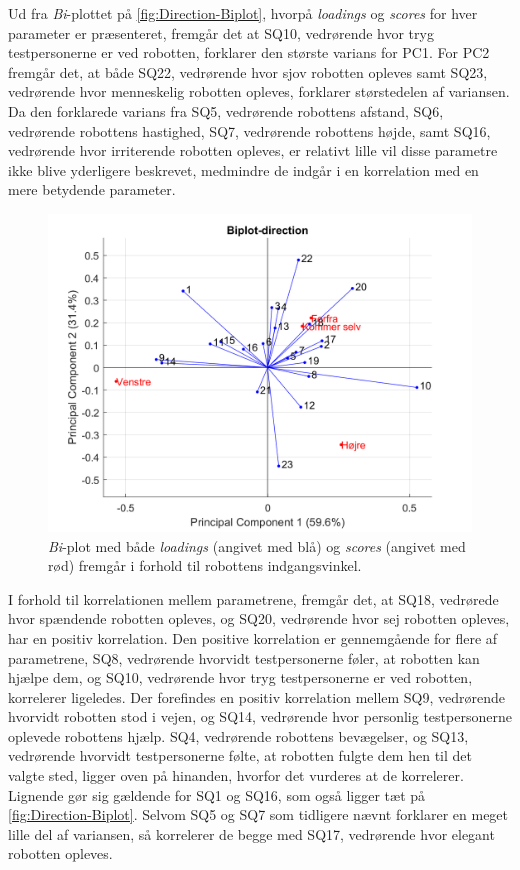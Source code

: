 \newpage
\noindent
%
Ud fra \textit{Bi}-plottet på \autoref{fig:Direction-Biplot}, hvorpå \textit{loadings} og \textit{scores} for hver parameter er præsenteret, fremgår det at SQ10, vedrørende hvor tryg testpersonerne er ved robotten, forklarer den største varians for PC1. For PC2 fremgår det, at både SQ22, vedrørende hvor sjov robotten opleves samt SQ23, vedrørende hvor menneskelig robotten opleves, forklarer størstedelen af variansen. Da den forklarede varians fra SQ5, vedrørende robottens afstand, SQ6, vedrørende robottens hastighed, SQ7, vedrørende robottens højde, samt SQ16, vedrørende hvor irriterende robotten opleves, er relativt lille vil disse parametre ikke blive yderligere beskrevet, medmindre de indgår i en korrelation med en mere betydende parameter.  
%
\begin{figure}[H]
\centering
\includegraphics[width=\textwidth]{Figure/DatabehandlingSkalaer/PCAfigures/Direction-Biplot.png}
\caption{\textit{Bi}-plot med både \textit{loadings} (angivet med blå) og \textit{scores} (angivet med rød) fremgår i forhold til robottens indgangsvinkel.}
\label{fig:Direction-Biplot}
\end{figure}
\noindent
%
I forhold til korrelationen mellem parametrene, fremgår det, at SQ18, vedrørede hvor spændende robotten opleves, og SQ20, vedrørende hvor sej robotten opleves, har en positiv korrelation. Den positive korrelation er gennemgående for flere af parametrene, SQ8, vedrørende hvorvidt testpersonerne føler, at robotten kan hjælpe dem, og SQ10, vedrørende hvor tryg testpersonerne er ved robotten, korrelerer ligeledes. Der forefindes en positiv korrelation mellem SQ9, vedrørende hvorvidt robotten stod i vejen, og SQ14, vedrørende hvor personlig testpersonerne oplevede robottens hjælp. SQ4, vedrørende robottens bevægelser, og SQ13, vedrørende hvorvidt testpersonerne følte, at robotten fulgte dem hen til det valgte sted, ligger oven på hinanden, hvorfor det vurderes at de korrelerer. Lignende gør sig gældende for SQ1 og SQ16, som også ligger tæt på \autoref{fig:Direction-Biplot}. Selvom SQ5 og SQ7 som tidligere nævnt forklarer en meget lille del af variansen, så korrelerer de begge med SQ17, vedrørende hvor elegant robotten opleves.   

